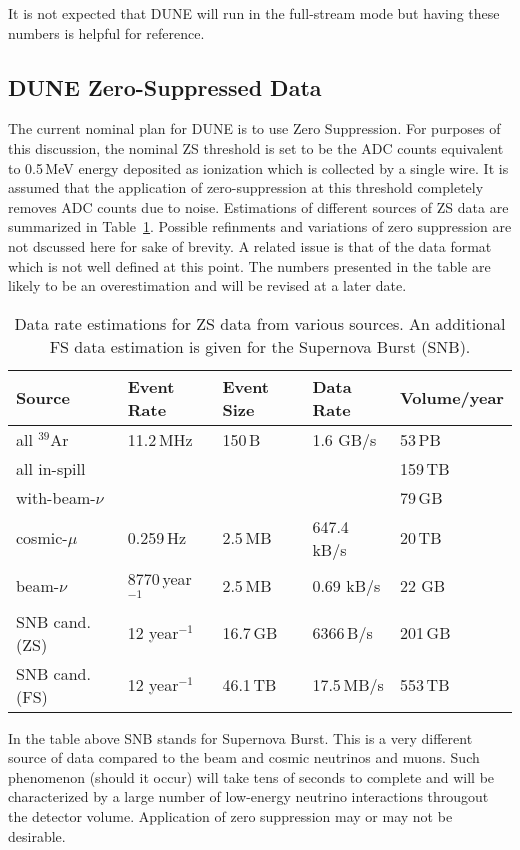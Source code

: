 \documentclass[pdftex,12pt,letter]{article}
\begin{document}
\noindent It is not expected that DUNE will run in the full-stream mode but having these numbers is helpful for reference.


\subsection{DUNE Zero-Suppressed Data}
\label{sec:zs-data}
The current nominal plan for DUNE is to use Zero Suppression. For purposes of this discussion, the nominal
ZS threshold is set to be the ADC counts equivalent to 0.5\,MeV energy deposited
as ionization which is collected by a single wire. It is assumed that the application of zero-suppression at this
threshold completely removes ADC counts due to noise. %
Estimations of different sources of ZS data are summarized in Table~\ref{tab:zs-volume}. Possible refinments
and variations of zero suppression are not dscussed here for sake of brevity. A related issue
is that of the data format which is not well defined at this point. The numbers presented
in the table are likely to be an overestimation and will be revised at a later date.

	
\begin{table}[ht!]
\centering
\begin{tabular}{| p{1.2in} | p{0.9in} | p{0.75in} | p{0.8in} | p{0.9in} |}		\hline		
Source & Event Rate & Event Size & Data Rate & Volume/year \\ \hline
all $^{39}$Ar & 11.2\,MHz & 150\,B & 1.6 GB/s &  53\,PB \\ \hline
all in-spill & & & & 159\,TB \\ \hline
with-beam-$\nu$ & & & & 79\,GB \\ \hline \hline
cosmic-$\mu$ & 0.259\,Hz &2.5\,MB & 647.4\,kB/s & 20\,TB \\	\hline
beam-$\nu$ & 8770\,year$^{-1}$ & 2.5\,MB & 0.69 kB/s & 22 GB \\ \hline \hline
SNB cand. (ZS) & 12 year$^{-1}$ & 16.7\,GB & 6366\,B/s & 201\,GB \\ \hline
SNB cand. (FS) & 12 year$^{-1}$ & 46.1\,TB & 17.5\,MB/s & 553\,TB \\ \hline
\end{tabular}
\caption{Data rate estimations for ZS data from various sources.
An additional FS data estimation is given for the Supernova Burst (SNB).}
\label{tab:zs-volume}

\end{table}
\noindent In the table above SNB stands for Supernova Burst. This is a very different source of data compared to the beam
and cosmic neutrinos and muons. Such phenomenon (should it occur) will take tens of seconds to complete and will be
characterized by a large number of low-energy neutrino interactions througout the detector volume. Application of
zero suppression may or may not be desirable.
\end{document}
